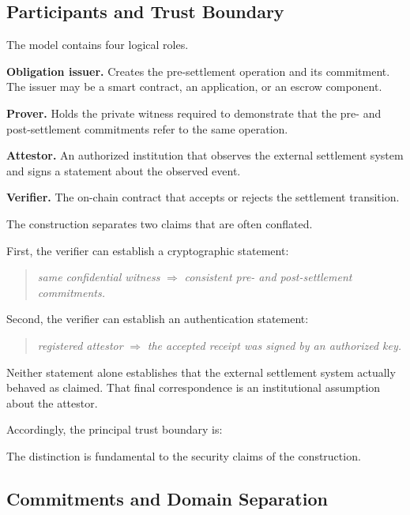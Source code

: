 \documentclass[10pt,twocolumn]{article}
\begin{document}
\subsection{Participants and Trust Boundary}

The model contains four logical roles.

\textbf{Obligation issuer.} Creates the pre-settlement operation and its
commitment. The issuer may be a smart contract, an application, or an
escrow component.

\textbf{Prover.} Holds the private witness required to demonstrate that
the pre- and post-settlement commitments refer to the same operation.

\textbf{Attestor.} An authorized institution that observes the external
settlement system and signs a statement about the observed event.

\textbf{Verifier.} The on-chain contract that accepts or rejects the
settlement transition.

The construction separates two claims that are often conflated.

First, the verifier can establish a cryptographic statement:
\begin{quote}
\small
\emph{same confidential witness} $\Rightarrow$ \emph{consistent pre- and
post-settlement commitments.}
\end{quote}
Second, the verifier can establish an authentication statement:
\begin{quote}
\small
\emph{registered attestor} $\Rightarrow$ \emph{the accepted receipt was
signed by an authorized key.}
\end{quote}
Neither statement alone establishes that the external settlement system
actually behaved as claimed. That final correspondence is an
institutional assumption about the attestor.

Accordingly, the principal trust boundary is:
\begin{quote}
\small
{}
\end{quote}
The distinction is fundamental to the security claims of the
construction.

\subsection{Commitments and Domain Separation}
\label{sec:model-commitments}
\end{document}
